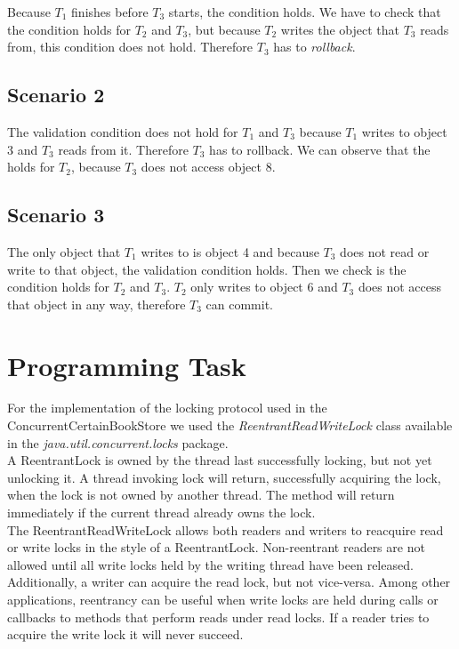 \documentclass{article}      %
\begin{document}
Because $T_1$ finishes before $T_3$ starts, the  condition holds. We have to check that the  condition holds for $T_2$ and $T_3$, but because $T_2$ writes the object that $T_3$ reads from, this condition does not hold. Therefore $T_3$ has to \emph{rollback}.\\

\subsection*{Scenario 2}

The  validation condition does not hold for $T_1$ and $T_3$ because $T_1$ writes to object 3 and $T_3$ reads from it. Therefore $T_3$ has to rollback. We can observe that the  holds for $T_2$, because $T_3$ does not access object 8.\\

\subsection*{Scenario 3}

The only object that $T_1$ writes to is object 4 and because $T_3$ does not read or write to that object, the  validation condition holds. Then we check is the  condition holds for $T_2$ and $T_3$. $T_2$ only writes to object 6 and $T_3$ does not access that object in any way, therefore $T_3$ can commit.\\

\section*{Programming Task}

For the implementation of the locking protocol used in the ConcurrentCertainBookStore we used the \emph{ReentrantReadWriteLock} class available in the \emph{java.util.concurrent.locks} package. \\

A ReentrantLock is owned by the thread last successfully locking, but not yet unlocking it. A thread invoking lock will return, successfully acquiring the lock, when the lock is not owned by another thread. The method will return immediately if the current thread already owns the lock.\\

The ReentrantReadWriteLock allows both readers and writers to reacquire read or write locks in the style of a ReentrantLock. Non-reentrant readers are not allowed until all write locks held by the writing thread have been released. Additionally, a writer can acquire the read lock, but not vice-versa. Among other applications, reentrancy can be useful when write locks are held during calls or callbacks to methods that perform reads under read locks. If a reader tries to acquire the write lock it will never succeed.\\
\end{document}
